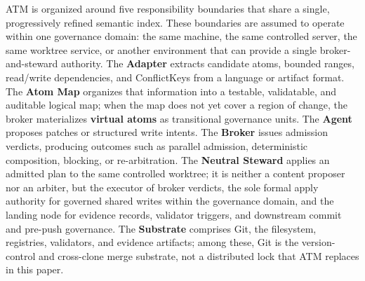 \documentclass[9pt,letterpaper]{extarticle}
\begin{document}
ATM is organized around five responsibility boundaries that share a single, progressively refined semantic index. These boundaries are assumed to operate within one governance domain: the same machine, the same controlled server, the same worktree service, or another environment that can provide a single broker-and-steward authority. The \textbf{Adapter} extracts candidate atoms, bounded ranges, read/write dependencies, and ConflictKeys from a language or artifact format. The \textbf{Atom Map} organizes that information into a testable, validatable, and auditable logical map; when the map does not yet cover a region of change, the broker materializes \textbf{virtual atoms} as transitional governance units. The \textbf{Agent} proposes patches or structured write intents. The \textbf{Broker} issues admission verdicts, producing outcomes such as parallel admission, deterministic composition, blocking, or re-arbitration. The \textbf{Neutral Steward} applies an admitted plan to the same controlled worktree; it is neither a content proposer nor an arbiter, but the executor of broker verdicts, the sole formal apply authority for governed shared writes within the governance domain, and the landing node for evidence records, validator triggers, and downstream commit and pre-push governance. The \textbf{Substrate} comprises Git, the filesystem, registries, validators, and evidence artifacts; among these, Git is the version-control and cross-clone merge substrate, not a distributed lock that ATM replaces in this paper.
\end{document}
